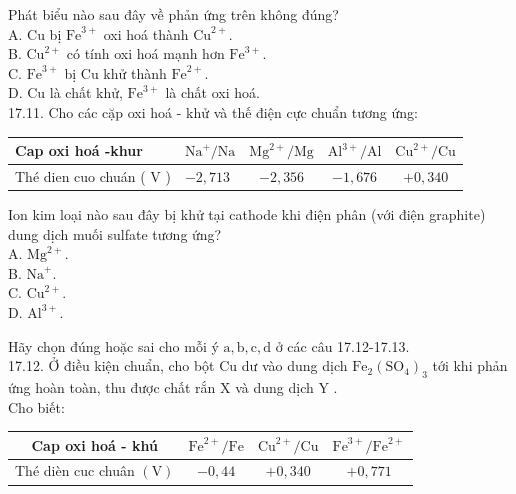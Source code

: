 \documentclass[10pt]{article}
\begin{document}
Phát biểu nào sau đây về phản ứng trên không đúng?\\
A. Cu bị $\mathrm{Fe}^{3+}$ oxi hoá thành $\mathrm{Cu}^{2+}$.\\
B. $\mathrm{Cu}^{2+}$ có tính oxi hoá mạnh hơn $\mathrm{Fe}^{3+}$.\\
C. $\mathrm{Fe}^{3+}$ bị Cu khử thành $\mathrm{Fe}^{2+}$.\\
D. Cu là chất khử, $\mathrm{Fe}^{3+}$ là chất oxi hoá.\\
17.11. Cho các cặp oxi hoá - khử và thế điện cực chuẩn tương ứng:

\begin{center}
\begin{tabular}{|l|l|c|c|c|}
\hline
Cap oxi hoá -khur & $\mathrm{Na}^{+} / \mathrm{Na}$ & $\mathrm{Mg}^{2+} / \mathrm{Mg}$ & $\mathrm{Al}^{3+} / \mathrm{Al}$ & $\mathrm{Cu}^{2+} / \mathrm{Cu}$ \\
\hline
Thé dien cuo chuán ( V ) & $-2,713$ & $-2,356$ & $-1,676$ & $+0,340$ \\
\hline
\end{tabular}
\end{center}

Ion kim loại nào sau đây bị khử tại cathode khi điện phân (với điện graphite) dung dịch muối sulfate tương ứng?\\
A. $\mathrm{Mg}^{2+}$.\\
B. $\mathrm{Na}^{+}$.\\
C. $\mathrm{Cu}^{2+}$.\\
D. $\mathrm{Al}^{3+}$.

Hãy chọn đúng hoặc sai cho mỗi ý $\mathrm{a}, \mathrm{b}, \mathrm{c}, \mathrm{d}$ ở các câu 17.12-17.13.\\
17.12. Ở điều kiện chuẩn, cho bột Cu dư vào dung dịch $\mathrm{Fe}_{2}\left(\mathrm{SO}_{4}\right)_{3}$ tới khi phản ứng hoàn toàn, thu được chất rắn X và dung dịch Y .\\
Cho biết:

\begin{center}
\begin{tabular}{|c|c|c|c|}
\hline
Cap oxi hoá - khú & $\mathrm{Fe}^{2+} / \mathrm{Fe}$ & $\mathrm{Cu}^{2+} / \mathrm{Cu}$ & $\mathrm{Fe}^{3+} / \mathrm{Fe}^{2+}$ \\
\hline
Thé dièn cuc chuân $(\mathrm{V})$ & $-0,44$ & $+0,340$ & $+0,771$ \\
\hline
\end{tabular}
\end{center}
\end{document}
